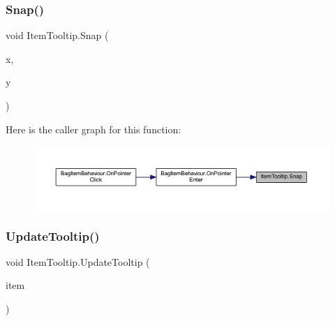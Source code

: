 \subsubsection{\texorpdfstring{Snap()}{Snap()}}
{\footnotesize\ttfamily void Item\+Tooltip.\+Snap (\begin{DoxyParamCaption}\item[{float}]{x,  }\item[{float}]{y }\end{DoxyParamCaption})}

Here is the caller graph for this function\+:\nopagebreak
\begin{figure}[H]
\begin{center}
\leavevmode
\includegraphics[width=350pt]{class_item_tooltip_ae6eb8ab5acd326e431e46a3df5b76fa4_icgraph}
\end{center}
\end{figure}
\mbox{\label{class_item_tooltip_a51e15cd0c208c14105cc8bedf452385b}} 
\subsubsection{\texorpdfstring{UpdateTooltip()}{UpdateTooltip()}}
{\footnotesize\ttfamily void Item\+Tooltip.\+Update\+Tooltip (\begin{DoxyParamCaption}\item[{\mbox{\hyperlink{class_base_item}{Base\+Item}}}]{item }\end{DoxyParamCaption})}


